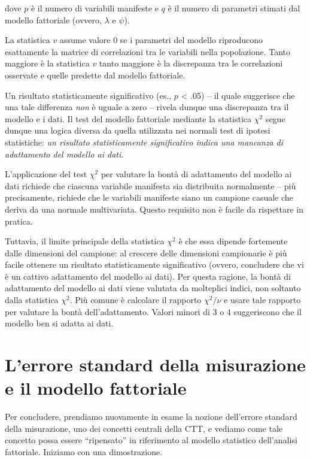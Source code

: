 \documentclass[
  11pt,
]{krantz}
\theoremstyle{definition}
\theoremstyle{definition}
\theoremstyle{definition}
\theoremstyle{definition}
\theoremstyle{remark}
\begin{document}
dove \(p\) è il numero di variabili manifeste e \(q\) è il numero di parametri stimati dal modello fattoriale (ovvero, \(\lambda\) e \(\psi\)).

La statistica \(v\) assume valore 0 se i parametri del modello riproducono esattamente la matrice di correlazioni tra le variabili nella popolazione. Tanto maggiore è la statistica \(v\) tanto maggiore è la discrepanza tra le correlazioni osservate e quelle predette dal modello fattoriale.

Un risultato statisticamente significativo (es., \(p\) \textless{} .05) -- il quale suggerisce che una tale differenza \emph{non} è uguale a zero -- rivela dunque una discrepanza tra il modello e i dati. Il test del modello fattoriale mediante la statistica \(\chi^2\) segue dunque una logica diversa da quella utilizzata nei normali test di ipotesi statistiche: \emph{un risultato statisticamente significativo indica una mancanza di adattamento del modello ai dati}.

L'applicazione del test \(\chi^2\) per valutare la bontà di adattamento del modello ai dati richiede che ciascuna variabile manifesta sia distribuita normalmente -- più precisamente, richiede che le variabili manifeste siano un campione casuale che deriva da una normale multivariata. Questo requisito non è facile da rispettare in pratica.

Tuttavia, il limite principale della statistica \(\chi^2\) è che essa dipende fortemente dalle dimensioni del campione: al crescere delle dimensioni campionarie è più facile ottenere un risultato statisticamente significativo (ovvero, concludere che vi è un cattivo adattamento del modello ai dati). Per questa ragione, la bontà di adattamento del modello ai dati viene valutata da molteplici indici, non soltanto dalla statistica \(\chi^2\). Più comune è calcolare il rapporto \(\chi^2 / \nu\) e usare tale rapporto per valutare la bontà dell'adattamento. Valori minori di 3 o 4 suggeriscono che il modello ben si adatta ai dati.

\hypertarget{lerrore-standard-della-misurazione-e-il-modello-fattoriale}{%
\section{L'errore standard della misurazione e il modello fattoriale}\label{lerrore-standard-della-misurazione-e-il-modello-fattoriale}}

Per concludere, prendiamo nuovamente in esame la nozione dell'errore standard della misurazione, uno dei concetti centrali della CTT, e vediamo come tale concetto possa essere ``ripensato'' in riferimento al modello statistico dell'analisi fattoriale. Iniziamo con una dimostrazione.
\end{document}
